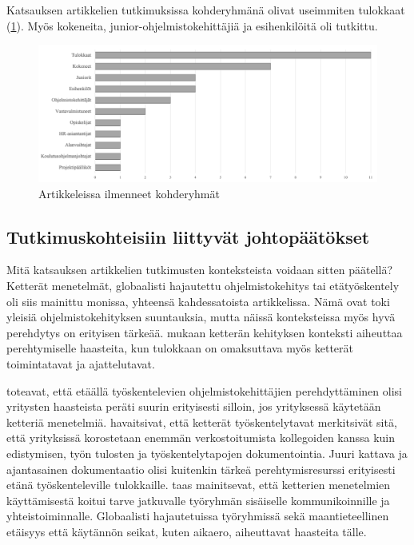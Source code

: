 \documentclass[utf8]{gradu3}
\begin{document}
Katsauksen artikkelien tutkimuksissa kohderyhmänä olivat useimmiten tulokkaat (\ref{kuvio:kohderyhmat}). Myös kokeneita, junior-ohjelmistokehittäjiä ja esihenkilöitä oli tutkittu. 

\begin{figure}[h]
    \centering
    \includegraphics[width=\textwidth]{media/kohderyhmat.png}
    \caption{Artikkeleissa ilmenneet kohderyhmät}
    \label{kuvio:kohderyhmat}
\end{figure}


\subsection{Tutkimuskohteisiin liittyvät johtopäätökset}

Mitä katsauksen artikkelien tutkimusten konteksteista voidaan sitten päätellä? Ketterät menetelmät, globaalisti hajautettu ohjelmistokehitys tai etätyöskentely oli siis mainittu monissa, yhteensä kahdessatoista artikkelissa. Nämä ovat toki yleisiä ohjelmistokehityksen suuntauksia, mutta näissä konteksteissa myös hyvä perehdytys on erityisen tärkeää. \textcite{gregory-ym-2020} mukaan ketterän kehityksen konteksti aiheuttaa perehtymiselle haasteita, kun tulokkaan on omaksuttava myös ketterät toimintatavat ja ajattelutavat. 

\textcite{britto-ym-2017} toteavat, että etäällä työskentelevien ohjelmistokehittäjien perehdyttäminen olisi yritysten haasteista peräti suurin erityisesti silloin, jos yrityksessä käytetään ketteriä menetelmiä. \textcite{britto-ym-2017} havaitsivat, että ketterät työskentelytavat merkitsivät sitä, että yrityksissä korostetaan enemmän verkostoitumista kollegoiden kanssa kuin edistymisen, työn tulosten ja työskentelytapojen dokumentointia. Juuri kattava ja ajantasainen dokumentaatio olisi kuitenkin tärkeä perehtymisresurssi erityisesti etänä työskenteleville tulokkaille. \textcite{moe-ym-2020} taas mainitsevat, että ketterien menetelmien käyttämisestä koitui tarve jatkuvalle työryhmän sisäiselle kommunikoinnille ja yhteistoiminnalle. Globaalisti hajautetuissa työryhmissä sekä maantieteellinen etäisyys että käytännön seikat, kuten aikaero, aiheuttavat haasteita tälle.
\end{document}
